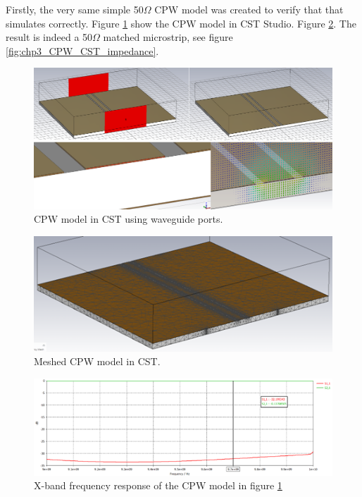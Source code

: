 Firstly, the very same simple 50$\Omega$ CPW model was created to verify that that simulates correctly. Figure \ref{fig:chp3_CPW_CST_waveguide_port} show the CPW model in CST Studio. Figure \ref{fig:chp3_CPW_CST_mesh}. The result is indeed a 50$\Omega$ matched microstrip, see figure \ref{fig:chp3_CPW_CST_impedance}.

    \begin{figure}[H]
    \centering
    \includegraphics[width=0.7\linewidth]{Figures/chp3_CPW_CST_waveguide_port.png}
    \caption{CPW model in CST using waveguide ports.}
    \label{fig:chp3_CPW_CST_waveguide_port}
    \end{figure}

    \begin{figure}[H]
    \centering
    \includegraphics[width=0.5\linewidth]{Figures/chp3_CPW_CST_mesh.png}
    \caption{Meshed CPW model in CST.}
    \label{fig:chp3_CPW_CST_mesh}
    \end{figure}

    \begin{figure}[H]
    \centering
    \includegraphics[width=0.9\linewidth]{Figures/chp3_CPW_CST_results_zoom.png}
    \caption{X-band frequency response of the CPW model in figure \ref{fig:chp3_CPW_CST_waveguide_port}}
    \label{fig:chp3_CPW_CST_results_zoom}
    \end{figure}

